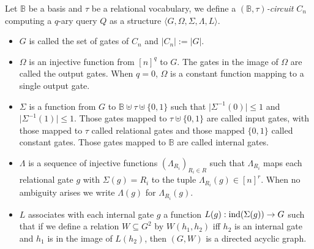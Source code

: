 \documentclass[../paper.tex]{subfiles}
\begin{document}
\begin{definition}
  Let $\mathbb{B}$ be a basis and $\tau$ be a relational vocabulary, we define a
  \emph{$(\mathbb{B}, \tau)$-circuit} $C_n$ computing a $q$-ary query $Q$ as a
  structure $\langle G, \Omega, \Sigma, \Lambda, L \rangle$.
  \begin{itemize}
    \setlength\itemsep{0mm}
  \item $G$ is called the set of gates of $C_n$ and $\vert C_n \vert := \vert G
    \vert$.
  \item $\Omega$ is an injective function from $[n]^q$ to $G$. The gates in the
    image of $\Omega$ are called the output gates. When $q = 0$, $\Omega$ is a
    constant function mapping to a single output gate.
  \item $\Sigma$ is a function from $G$ to $\mathbb{B} \uplus \tau \uplus
    \{0,1\} $ such that $\vert \Sigma^{-1} (0) \vert \leq 1$ and $\vert
    \Sigma^{-1} (1) \vert \leq 1$. Those gates mapped to $\tau \uplus \{0,1\}$
    are called input gates, with those mapped to $\tau$ called relational gates
    and those mapped $\{0,1\}$ called constant gates. Those gates mapped to
    $\mathbb{B}$ are called internal gates.
  \item $\Lambda$ is a sequence of injective functions $(\Lambda_{R_i})_{R_i \in
      R}$ such that $\Lambda_{R_i}$ maps each relational gate $g$ with $\Sigma
    (g) = R_i$ to the tuple $\Lambda_{R_i} (g) \in [n]^{r}$. When no ambiguity
    arises we write $\Lambda (g)$ for $\Lambda_{R_i} (g)$.
  \item $L$ associates with each internal gate $g$ a function $L(g):
    \text{\upshape ind}(\Sigma(g)) \rightarrow G$ such that if we define a relation $W
    \subseteq G^{2}$ by $W(h_1,h_2)$ iff $h_2$ is an internal gate and $h_1$ is
    in the image of $L(h_2)$, then $(G, W)$ is a directed acyclic graph.
  \end{itemize}
\end{definition}
\end{document}
